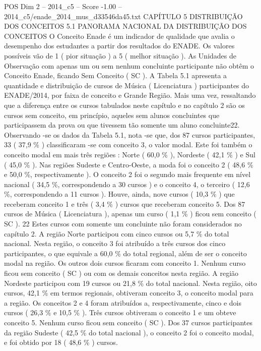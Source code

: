 \begin{textsample}{POS Dim 2 – 2014\_c5 – Score -1.00 – 2014\_c5/enade\_2014\_mus\_d33546da45.txt}  \label{ex:f2_pos_311}
CAPÍTULO 5 DISTRIBUIÇÃO DOS CONCEITOS 5.1 PANORAMA NACIONAL DA DISTRIBUIÇÃO DOS CONCEITOS O Conceito Enade é um indicador de qualidade que avalia o desempenho dos estudantes a partir dos resultados do ENADE.
Os valores possíveis vão de 1 ( pior situação ) a 5 ( melhor situação ).
As Unidades de Observação com apenas um ou sem nenhum concluinte participante não obtêm o Conceito Enade, ficando Sem Conceito ( SC ).
A Tabela 5.1 apresenta a quantidade e distribuição de cursos de Música ( Licenciatura ) participantes do ENADE/2014, por faixa de conceito e Grande Região.
Mais uma vez, ressaltando que a diferença entre os cursos tabulados neste capítulo e no capítulo 2 são os cursos sem conceito, em princípio, aqueles sem alunos concluintes que participassem da prova ou que tivessem tão somente um aluno concluinte22.
Observando -se os dados da Tabela 5.1, nota -se que, dos 87 cursos participantes, 33 ( 37,9 \% ) classificaram -se com conceito 3, o valor modal.
Este foi também o conceito modal em mais três regiões : Norte ( 60,0 \% ), Nordeste ( 42,1 \% ) e Sul ( 45,0 \% ).
Nas regiões Sudeste e Centro-Oeste, a moda foi o conceito 2 ( 48,6 \% e 50,0 \%, respectivamente ).
O conceito 2 foi o segundo mais frequente em nível nacional ( 34,5 \%, correspondendo a 30 cursos ) e o conceito 4, o terceiro ( 12,6 \%, correspondendo a 11 cursos ).
Houve, ainda, nove cursos ( 10,3 \% ) que receberam conceito 1 e três ( 3,4 \% ) cursos que receberam conceito 5.
Dos 87 cursos de Música ( Licenciatura ), apenas um curso ( 1,1 \% ) ficou sem conceito ( SC ). 22 Estes cursos com somente um concluinte não foram considerados no capítulo 2.
A região Norte participou com cinco cursos ou 5,7 \% do total nacional.
Nesta região, o conceito 3 foi atribuído a três cursos dos cinco participantes, o que equivale a 60,0 \% do total regional, além de ser o conceito modal na região.
Os outros dois cursos ficaram com conceito 1.
Nenhum curso ficou sem conceito ( SC ) ou com os demais conceitos nesta região.
A região Nordeste participou com 19 cursos ou 21,8 \% do total nacional.
Nesta região, oito cursos, 42,1 \% em termos regionais, obtiveram conceito 3, o conceito modal para a região.
Os conceitos 2 e 4 foram atribuídos a, respectivamente, cinco e dois cursos ( 26,3 \% e 10,5 \% ).
Três cursos obtiveram o conceito 1 e um obteve conceito 5.
Nenhum curso ficou sem conceito ( SC ).
Dos 37 cursos participantes da região Sudeste ( 42,5 \% do total nacional ), o conceito 2 foi o conceito modal, e foi obtido por 18 ( 48,6 \% ) cursos.

\end{textsample}
